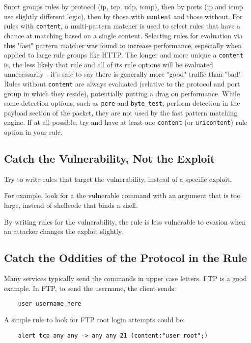 \documentclass[english]{report}
\begin{document}
Snort groups rules by protocol (ip, tcp, udp, icmp), then by ports
(ip and icmp use slightly different logic), then by those with \texttt{content}
and those without.  For rules with \texttt{content}, a multi-pattern matcher is
used to select rules that have a chance at matching based on a single content.
Selecting rules for evaluation via this "fast" pattern matcher was found to
increase performance, especially when applied to large rule groups like HTTP.
The longer and more unique a \texttt{content} is, the less likely that rule and
all of its rule options will be evaluated unnecessarily - it's safe to say
there is generally more "good" traffic than "bad".  Rules without
\texttt{content} are always evaluated (relative to the protocol and port group
in which they reside), potentially putting a drag on performance.
While some detection options, such as \texttt{pcre} and \texttt{byte\_test},
perform detection in the payload section of the packet, they are not used by the
fast pattern matching engine.  If at all possible, try and have at least one
\texttt{content} (or \texttt{uricontent}) rule option in your rule.

\subsection{Catch the Vulnerability, Not the Exploit}

Try to write rules that target the vulnerability, instead of a specific
exploit.

For example, look for a the vulnerable command with an argument that is too
large, instead of shellcode that binds a shell.

By writing rules for the vulnerability, the rule is less vulnerable to evasion
when an attacker changes the exploit slightly.

\subsection{Catch the Oddities of the Protocol in the Rule}

Many services typically send the commands in upper case letters.  FTP is a good
example.  In FTP, to send the username, the client sends:

\begin{verbatim}
    user username_here
\end{verbatim}

A simple rule to look for FTP root login attempts could be:

\begin{verbatim}
    alert tcp any any -> any any 21 (content:"user root";)
\end{verbatim}
\end{document}
